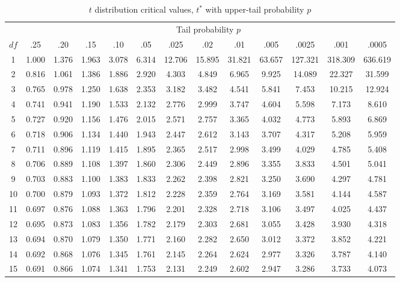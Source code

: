 \begin{table}[H]
\centering
\footnotesize
\setlength{\tabcolsep}{3.5pt}
\caption{$t$ distribution critical values, $t^*$ with upper-tail probability $p$}
\label{tab:t-critical}
\begin{tabular}{c|cccccccccccc}
 & \multicolumn{12}{c}{Tail probability $p$} \\
$df$ & .25 & .20 & .15 & .10 & .05 & .025 & .02 & .01 & .005 & .0025 & .001 & .0005 \\
\hline
1 & 1.000 & 1.376 & 1.963 & 3.078 & 6.314 & 12.706 & 15.895 & 31.821 & 63.657 & 127.321 & 318.309 & 636.619 \\
2 & 0.816 & 1.061 & 1.386 & 1.886 & 2.920 & 4.303 & 4.849 & 6.965 & 9.925 & 14.089 & 22.327 & 31.599 \\
3 & 0.765 & 0.978 & 1.250 & 1.638 & 2.353 & 3.182 & 3.482 & 4.541 & 5.841 & 7.453 & 10.215 & 12.924 \\
4 & 0.741 & 0.941 & 1.190 & 1.533 & 2.132 & 2.776 & 2.999 & 3.747 & 4.604 & 5.598 & 7.173 & 8.610 \\
5 & 0.727 & 0.920 & 1.156 & 1.476 & 2.015 & 2.571 & 2.757 & 3.365 & 4.032 & 4.773 & 5.893 & 6.869 \\
6 & 0.718 & 0.906 & 1.134 & 1.440 & 1.943 & 2.447 & 2.612 & 3.143 & 3.707 & 4.317 & 5.208 & 5.959 \\
7 & 0.711 & 0.896 & 1.119 & 1.415 & 1.895 & 2.365 & 2.517 & 2.998 & 3.499 & 4.029 & 4.785 & 5.408 \\
8 & 0.706 & 0.889 & 1.108 & 1.397 & 1.860 & 2.306 & 2.449 & 2.896 & 3.355 & 3.833 & 4.501 & 5.041 \\
9 & 0.703 & 0.883 & 1.100 & 1.383 & 1.833 & 2.262 & 2.398 & 2.821 & 3.250 & 3.690 & 4.297 & 4.781 \\
10 & 0.700 & 0.879 & 1.093 & 1.372 & 1.812 & 2.228 & 2.359 & 2.764 & 3.169 & 3.581 & 4.144 & 4.587 \\
11 & 0.697 & 0.876 & 1.088 & 1.363 & 1.796 & 2.201 & 2.328 & 2.718 & 3.106 & 3.497 & 4.025 & 4.437 \\
12 & 0.695 & 0.873 & 1.083 & 1.356 & 1.782 & 2.179 & 2.303 & 2.681 & 3.055 & 3.428 & 3.930 & 4.318 \\
13 & 0.694 & 0.870 & 1.079 & 1.350 & 1.771 & 2.160 & 2.282 & 2.650 & 3.012 & 3.372 & 3.852 & 4.221 \\
14 & 0.692 & 0.868 & 1.076 & 1.345 & 1.761 & 2.145 & 2.264 & 2.624 & 2.977 & 3.326 & 3.787 & 4.140 \\
15 & 0.691 & 0.866 & 1.074 & 1.341 & 1.753 & 2.131 & 2.249 & 2.602 & 2.947 & 3.286 & 3.733 & 4.073 \\

\end{tabular}
\end{table}
